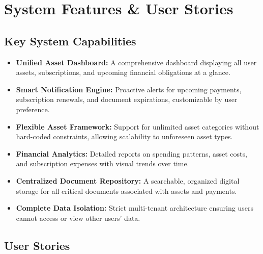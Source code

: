 \documentclass[11pt, a4paper]{article}
\begin{document}
	
	\section{System Features \& User Stories}
	
	\subsection{Key System Capabilities}
	\begin{itemize}
		\item \textbf{Unified Asset Dashboard:} A comprehensive dashboard displaying all user assets, subscriptions, and upcoming financial obligations at a glance.
		\item \textbf{Smart Notification Engine:} Proactive alerts for upcoming payments, subscription renewals, and document expirations, customizable by user preference.
		\item \textbf{Flexible Asset Framework:} Support for unlimited asset categories without hard-coded constraints, allowing scalability to unforeseen asset types.
		\item \textbf{Financial Analytics:} Detailed reports on spending patterns, asset costs, and subscription expenses with visual trends over time.
		\item \textbf{Centralized Document Repository:} A searchable, organized digital storage for all critical documents associated with assets and payments.
		\item \textbf{Complete Data Isolation:} Strict multi-tenant architecture ensuring users cannot access or view other users' data.
	\end{itemize}
	
	\subsection{User Stories}
	
\end{document}
